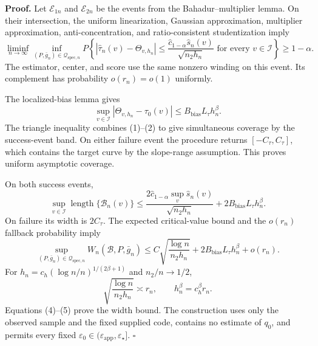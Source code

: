 \textbf{Proof.}
Let \(\mathcal E_{1n}\) and \(\mathcal E_{2n}\) be the events from the Bahadur--multiplier lemma. On their intersection, the uniform linearization, Gaussian approximation, multiplier approximation, anti-concentration, and ratio-consistent studentization imply
\[
 \liminf_{n\to\infty}\inf_{(P,\bar g_n)\in\mathcal Q_{\mathrm{spec},n}}
 P\left\{ |\widehat\tau_n(v)-\Theta_{v,h_n}|
 \le\frac{\widehat c_{1-\alpha}\widehat s_n(v)}{\sqrt{n_2h_n}}
 \text{ for every }v\in\mathcal I\right\}\ge1-\alpha. \tag{1}
\]
The estimator, center, and score use the same nonzero winding on this event. Its complement has probability \(o(r_n)=o(1)\) uniformly.

The localized-bias lemma gives
\[
 \sup_{v\in\mathcal I}|\Theta_{v,h_n}-\tau_0(v)|
 \le B_{\mathrm{bias}}L_\tau h_n^\beta. \tag{2}
\]
The triangle inequality combines (1)--(2) to give simultaneous coverage by the success-event band. On either failure event the procedure returns \([-C_\tau,C_\tau]\), which contains the target curve by the slope-range assumption. This proves uniform asymptotic coverage.

On both success events,
\[
 \sup_{v\in\mathcal I}\operatorname{length}\{\mathcal B_n(v)\}
 \le\frac{2\widehat c_{1-\alpha}\sup_v\widehat s_n(v)}{\sqrt{n_2h_n}}
 +2B_{\mathrm{bias}}L_\tau h_n^\beta. \tag{3}
\]
On failure its width is \(2C_\tau\). The expected critical-value bound and the \(o(r_n)\) fallback probability imply
\[
 \sup_{(P,\bar g_n)\in\mathcal Q_{\mathrm{spec},n}}
 W_n(\mathcal B,P,\bar g_n)
 \le C\sqrt{\frac{\log n}{n_2h_n}}
 +2B_{\mathrm{bias}}L_\tau h_n^\beta+o(r_n). \tag{4}
\]
For \(h_n=c_h(\log n/n)^{1/(2\beta+1)}\) and \(n_2/n\to1/2\),
\[
 \sqrt{\frac{\log n}{n_2h_n}}\asymp r_n,
 \qquad h_n^\beta=c_h^\beta r_n. \tag{5}
\]
Equations (4)--(5) prove the width bound. The construction uses only the observed sample and the fixed supplied code, contains no estimate of \(q_0\), and permits every fixed \(\varepsilon_0\in(\varepsilon_{\mathrm{app}},\varepsilon_\star]\). \(\square\)